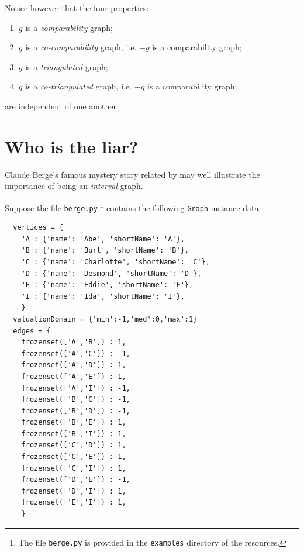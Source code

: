 Notice however that the four properties:
\begin{enumerate}[nosep]
\item $g$ is a \emph{comparability} graph;
\item $g$ is a \emph{co-comparability} graph, i.e. $-g$ is a comparability graph;
\item $g$ is a \emph{triangulated} graph;
\item $g$ is a \emph{co-triangulated} graph, i.e. $-g$ is a comparability graph;
\end{enumerate}
are independent of one another \citet[p. 275]{GOL-2004}.

\section{Who is the liar?}
\label{sec:23.2}

Claude Berge's famous mystery story related by \citet[p. 20]{GOL-2004} may well illustrate the importance of being an \emph{interval} graph.

Suppose the file \texttt{berge.py} \footnote{The file \texttt{berge.py} is provided in the \texttt{examples} directory of the \Digraph resources.} contains the following \texttt{Graph} instance data:
\begin{lstlisting}
  vertices = {
    'A': {'name': 'Abe', 'shortName': 'A'},
    'B': {'name': 'Burt', 'shortName': 'B'},
    'C': {'name': 'Charlotte', 'shortName': 'C'},
    'D': {'name': 'Desmond', 'shortName': 'D'},
    'E': {'name': 'Eddie', 'shortName': 'E'},
    'I': {'name': 'Ida', 'shortName': 'I'},
    }
  valuationDomain = {'min':-1,'med':0,'max':1}
  edges = {
    frozenset(['A','B']) : 1, 
    frozenset(['A','C']) : -1, 
    frozenset(['A','D']) : 1, 
    frozenset(['A','E']) : 1, 
    frozenset(['A','I']) : -1, 
    frozenset(['B','C']) : -1, 
    frozenset(['B','D']) : -1, 
    frozenset(['B','E']) : 1, 
    frozenset(['B','I']) : 1, 
    frozenset(['C','D']) : 1, 
    frozenset(['C','E']) : 1, 
    frozenset(['C','I']) : 1, 
    frozenset(['D','E']) : -1, 
    frozenset(['D','I']) : 1, 
    frozenset(['E','I']) : 1, 
    }
\end{lstlisting}

